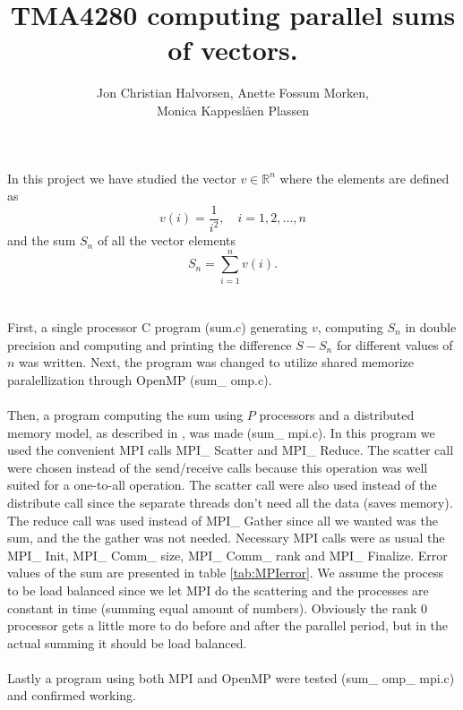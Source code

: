 \documentclass{article}
\title{TMA4280 computing parallel sums of vectors.}
\author{Jon Christian Halvorsen, Anette Fossum Morken, \\Monica Kappeslåen Plassen}
\begin{document}
\maketitle
In this project we have studied the vector $v \in \mathbb{R}^n$ where the elements are defined as 
\begin{equation}
\label{vdefinition}
	v(i) =\frac{1}{i^2},\quad i = 1,2,...,n
\end{equation}
and the sum $S_n$ of all the vector elements 
\begin{equation}
\label{Sdefinition}
	S_n = \sum_{i=1}^n v(i).
\end{equation}\\
\\
First, a single processor C program (sum.c) generating $v$, computing $S_n$ in double precision and computing and printing the difference $S - S_n$ for different values of $n$ was written. Next, the program was changed to utilize shared memorize paralellization through OpenMP (sum\_ omp.c). \\
\\
Then, a program computing the sum using $P$ processors and a distributed memory model, as described in \cite{oppgave}, was made (sum\_ mpi.c). In this program we used the convenient MPI calls MPI\_ Scatter and MPI\_ Reduce. The scatter call were chosen instead of the send/receive calls because this operation was well suited for a one-to-all operation. The scatter call were also used instead of the distribute call since the separate threads don't need all the data (saves memory). The reduce call was used instead of MPI\_ Gather since all we wanted was the sum, and the the gather was not needed. Necessary MPI calls were as usual the MPI\_ Init, MPI\_ Comm\_ size, MPI\_ Comm\_ rank and MPI\_ Finalize. Error values of the sum are presented in table \ref{tab:MPIerror}. We assume the process to be load balanced since we let MPI do the scattering and the processes are constant in time (summing equal amount of numbers). Obviously the rank 0 processor gets a little more to do before and after the parallel period, but in the actual summing it should be load balanced. \\
\\
Lastly a program using both MPI and OpenMP were tested (sum\_ omp\_ mpi.c) and confirmed working.
\end{document}
